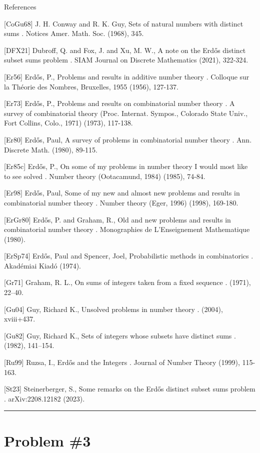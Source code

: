 \documentclass{article}
\begin{document}
References

[CoGu68] J. H. Conway and R. K. Guy, Sets of natural numbers with distinct sums . Notices Amer. Math. Soc. (1968), 345.

[DFX21] Dubroff, Q. and Fox, J. and Xu, M. W., A note on the Erd\H{o}s distinct subset sums problem . SIAM Journal on Discrete Mathematics (2021), 322-324.

[Er56] Erd\H{o}s, P., Problems and results in additive number theory . Colloque sur la Th\'{e}orie des Nombres, Bruxelles, 1955 (1956), 127-137.

[Er73] Erd\H{o}s, P., Problems and results on combinatorial number theory . A survey of combinatorial theory (Proc. Internat. Sympos., Colorado State Univ., Fort Collins, Colo., 1971) (1973), 117-138.

[Er80] Erd\H{o}s, Paul, A survey of problems in combinatorial number theory . Ann. Discrete Math. (1980), 89-115.

[Er85c] Erd\H{o}s, P., On some of my problems in number theory I would most like to see solved . Number theory (Ootacamund, 1984) (1985), 74-84.

[Er98] Erd\H{o}s, Paul, Some of my new and almost new problems and results in combinatorial number theory . Number theory (Eger, 1996) (1998), 169-180.

[ErGr80] Erd\H{o}s, P. and Graham, R., Old and new problems and results in combinatorial number theory . Monographies de L'Enseignement Mathematique (1980).

[ErSp74] Erd\H{o}s, Paul and Spencer, Joel, Probabilistic methods in combinatorics . Akad\'{e}miai Kiad\'{o} (1974).

[Gr71] Graham, R. L., On sums of integers taken from a fixed sequence . (1971), 22--40.

[Gu04] Guy, Richard K., Unsolved problems in number theory . (2004), xviii+437.

[Gu82] Guy, Richard K., Sets of integers whose subsets have distinct sums . (1982), 141--154.

[Ru99] Ruzsa, I., Erd\H{o}s and the Integers . Journal of Number Theory (1999), 115-163.

[St23] Steinerberger, S., Some remarks on the Erd\H{o}s distinct subset sums problem . arXiv:2208.12182 (2023).

\noindent\rule{\linewidth}{0.4pt}


\section{Problem \#3}
\label{prob:3}
\end{document}
